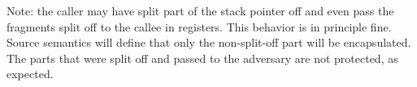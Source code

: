 \documentclass[a4paper]{article}
\begin{document}


Note: the caller may have split part of the stack pointer off and even pass the fragments split off to the callee in registers.
This behavior is in principle fine.
Source semantics will define that only the non-split-off part will be encapsulated.
The parts that were split off and passed to the adversary are not protected, as expected.


\end{document}
